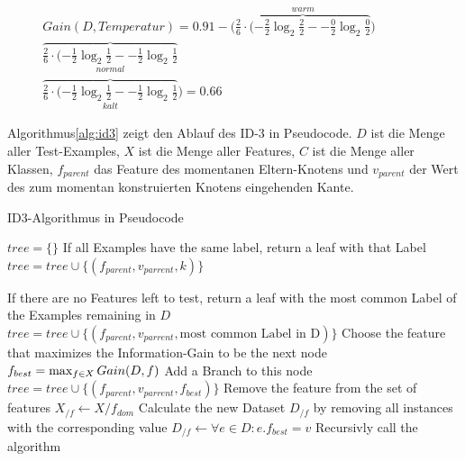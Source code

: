 \begin{equation}
\begin{split}
Gain(D,Temperatur) =  0.91 - \Big( \overbrace{\frac{2}{6} \cdot (-\frac{2}{2} \log_{2} \frac{2}{2} -  -\frac{0}{2} \log_{2} \frac{0}{2} }^{warm}   ) \quad \quad \quad \quad \\
\overbrace{\frac{2}{6} \cdot (-\frac{1}{2} \log_{2} \frac{1}{2} -  -\frac{1}{2} \log_{2} \frac{1}{2} }_{normal}   \quad \quad \quad \quad \\
\overbrace{\frac{2}{6} \cdot (-\frac{1}{2} \log_{2} \frac{1}{2} -  -\frac{1}{2} \log_{2} \frac{1}{2} }_{kalt} 
\Big)  = 0.66
\end{split}
\end{equation}

Algorithmus\ref{alg:id3} zeigt den Ablauf des ID-3 in Pseudocode. $D$ ist die Menge aller Test-Examples, $X$ ist die Menge aller Features, $C$ ist die Menge aller Klassen, $f_{parent}$ das Feature des momentanen Eltern-Knotens und  $v_{parent}$ der Wert des zum momentan konstruierten Knotens eingehenden Kante. \cite[S. 139]{machine_marsland} \cite[S. 56]{machine_mitchell}

\begin{algorithm}[H]
	\footnotesize
	\caption{ID3-Algorithmus in Pseudocode}
	\label{alg:id3}
	\begin{algorithmic}[1]
		\State $tree = \{ \}$
		\State \Comment If all Examples have the same label, return a leaf with that Label
		\State $tree = tree \cup \{(f_{parent}, v_{parrent},k)\}$
		\State \Return 
		
		\Else
		\State \Comment If there are no Features left to test, return a leaf with 
		\State \Comment the most common Label  of the Examples remaining in $D$
		\State $tree = tree \cup \{(f_{parent}, v_{parrent}, \text{most common Label in D})\}$
		\State \Return 
		\Else
		\State \Comment Choose the feature that maximizes the Information-Gain to be the next node
		\State $f_{best} = \operatorname*{max}_{f \in X} Gain(D,f)$
		\State \Comment Add a Branch to this node
		\State  $tree = tree \cup \{(f_{parent}, v_{parrent},f_{best})\}$
		\State \Comment Remove the feature from the set of features
		\State $X_{/f} \gets X / f_{dom}$
		\State \Comment Calculate the new Dataset $D_{/f}$ by removing all instances with the corresponding value
		\State $D_{/f} \gets \forall e \in D : e.f_{best} = v$
		\State \Comment Recursivly call the algorithm
		\State {}
		\EndFor
		\EndIf
		\EndIf
		
		\EndFunction
		
	\end{algorithmic}
\end{algorithm}

